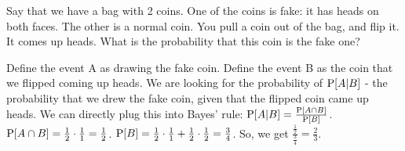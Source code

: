 \question Say that we have a bag with 2 coins. One of the coins is fake: it has heads on both faces. The other is a normal coin. You pull a coin out of the bag, and flip it. It comes up heads. What is the probability that this coin is the fake one? 

\begin{solution}[1.5 cm]
Define the event A as drawing the fake coin. Define the event B as the coin that we flipped coming up heads. We are looking for the probability of $\P[A|B]$ - the probability that we drew the fake coin, given that the flipped coin came up heads. We can directly plug this into Bayes' rule: $\P[A|B] = \frac{\P[A \cap B]}{\P[B]}$.  $\P[A \cap B] = \frac{1}{2} \cdot \frac{1}{1} = \frac{1}{2}$. $\P[B] = \frac{1}{2} \cdot \frac{1}{1} + \frac{1}{2} \cdot \frac{1}{2} = \frac{3}{4} $. So, we get $\frac{\frac{1}{2}}{\frac{3}{4}} = \frac{2}{3}$.
\end{solution}